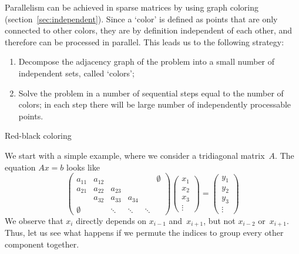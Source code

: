 

Parallelism can be achieved in sparse matrices by using graph coloring
(section~\ref{sec:independent}). Since a `color' is defined as points
that are only connected to other colors, they are by definition
independent of each other, and therefore can be processed in
parallel. This leads us to the following strategy:
\begin{enumerate}
\item Decompose the adjacency graph of the problem into a small number
  of independent sets, called `colors';
\item Solve the problem in a number of sequential steps equal to the
  number of colors; in each step there will be large number of
  independently processable points.
\end{enumerate}

 {Red-black coloring}
\label{sec:red-black}

We start with a simple example, where we consider a tridiagonal
matrix~$A$. The equation $Ax=b$ looks like
\[ 
\begin{pmatrix}
  a_{11}&a_{12}&&&&\emptyset\\ a_{21}&a_{22}&a_{23}\\ 
  &a_{32}&a_{33}&a_{34}\\ \emptyset&&\ddots&\ddots&\ddots
\end{pmatrix}
\begin{pmatrix}  x_1\\ x_2\\ x_3\\ \vdots\end{pmatrix} =
\begin{pmatrix}  y_1\\ y_2\\ y_3\\ \vdots\end{pmatrix}
\]
We observe that $x_i$ directly depends on $x_{i-1}$ and~$x_{i+1}$, but
not $x_{i-2}$ or~$x_{i+1}$. Thus, let us see what happens if we
permute the indices to group every other component together.

